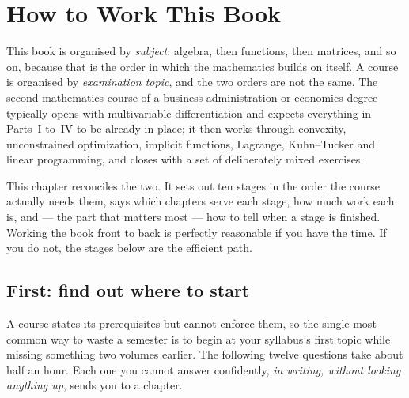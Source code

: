\chapter*{How to Work This Book}

This book is organised by \emph{subject}: algebra, then functions, then
matrices, and so on, because that is the order in which the mathematics
builds on itself. A course is organised by \emph{examination topic}, and the
two orders are not the same. The second mathematics course of a business
administration or economics degree typically opens with multivariable
differentiation and expects everything in Parts~I to~IV to be already in
place; it then works through convexity, unconstrained optimization, implicit
functions, Lagrange, Kuhn--Tucker and linear programming, and closes with a
set of deliberately mixed exercises.

This chapter reconciles the two. It sets out ten stages in the order the
course actually needs them, says which chapters serve each stage, how much
work each is, and --- the part that matters most --- how to tell when a
stage is finished. Working the book front to back is perfectly reasonable if
you have the time. If you do not, the stages below are the efficient path.

\section*{First: find out where to start}

A course states its prerequisites but cannot enforce them, so the single
most common way to waste a semester is to begin at your syllabus's first
topic while missing something two volumes earlier. The following twelve
questions take about half an hour. Each one you cannot answer confidently,
\emph{in writing, without looking anything up}, sends you to a chapter.

